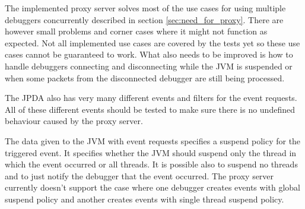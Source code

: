 \documentclass[..thesis.tex]{subfiles}
\begin{document}
The implemented proxy server solves most of the use cases for using multiple debuggers concurrently described in section \ref{sec:need_for_proxy}.
There are however small problems and corner cases where it might not function as expected.
Not all implemented use cases are covered by the tests yet so these use cases cannot be guaranteed to work.
What also needs to be improved is how to handle debuggers connecting and disconnecting while the JVM is suspended or when some packets from the disconnected debugger are still being processed.

The JPDA also has very many different events and filters for the event requests.
All of these different events should be tested to make sure there is no undefined behaviour caused by the proxy server.

The data given to the JVM with event requests specifies a suspend policy for the triggered event.
It specifies whether the JVM should suspend only the thread in which the event occurred or all threads.
It is possible also to suspend no threads and to just notify the debugger that the event occurred.
The proxy server currently doesn't support the case where one debugger creates events with global suspend policy and another creates events with single thread suspend policy.
\end{document}
